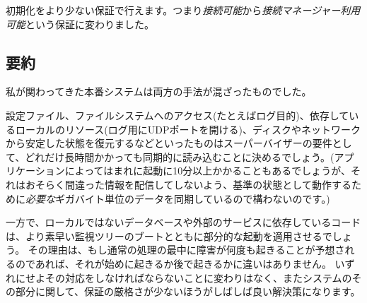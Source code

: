 初期化をより少ない保証で行えます。つまり\emph{接続可能}から\emph{接続マネージャー利用可能}という保証に変わりました。

\subsection{要約}
\label{subsec:start-link-in-a-nutshell}

私が関わってきた本番システムは両方の手法が混ざったものでした。

設定ファイル、ファイルシステムへのアクセス(たとえばログ目的)、依存しているローカルのリソース(ログ用にUDPポートを開ける)、ディスクやネットワークから安定した状態を復元するなどといったものはスーパーバイザーの要件として、どれだけ長時間かかっても同期的に読み込むことに決めるでしょう。(アプリケーションによってはまれに起動に10分以上かかることもあるでしょうが、それはおそらく間違った情報を配信してしないよう、基準の状態として動作するために\emph{必要な}ギガバイト単位のデータを同期しているので構わないのです。)

一方で、ローカルではないデータベースや外部のサービスに依存しているコードは、より素早い監視ツリーのブートとともに部分的な起動を適用させるでしょう。
その理由は、もし通常の処理の最中に障害が何度も起きることが予想されるのであれば、それが始めに起きるか後で起きるかに違いはありません。
いずれにせよその対応をしなければならないことに変わりはなく、またシステムのその部分に関して、保証の厳格さが少ないほうがしばしば良い解決策になります。

